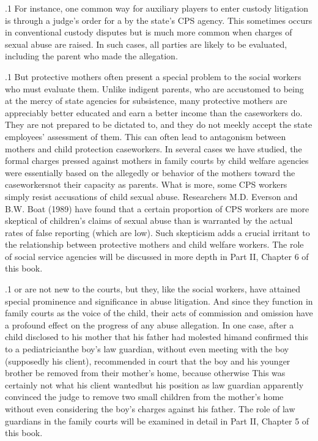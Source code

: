 \documentclass[11pt, twoside]{article}
\begin{document}
{\p.1{%
For instance, one common way for auxiliary players to enter custody
litigation is through a judge’s order for a  by the state’s CPS
agency. This sometimes occurs in conventional custody disputes but is
much more common when charges of sexual abuse are raised. In such
cases, all parties are likely to be evaluated, including the parent who
made the allegation.
}%

\p.1{%
But protective mothers often present a special problem to the social
workers who must evaluate them. Unlike indigent parents, who are accustomed to being at the mercy of state agencies for subsistence, many
protective mothers are appreciably better educated and earn a better income than the caseworkers do. They are not prepared to be dictated
to, and they do not meekly accept the state employees’ assessment of
them. This can often lead to antagonism between mothers and child
protection caseworkers. In several cases we have studied, the formal
charges pressed against mothers in family courts by child welfare agencies were essentially based on the allegedly  or 
behavior of the mothers toward the caseworkers\mdash{}not their capacity
as parents. What is more, some CPS workers simply resist accusations
of child sexual abuse. Researchers M.D. Everson and B.W. Boat (1989) have found
that a certain proportion of CPS workers are more skeptical of children’s
claims of sexual abuse than is warranted by the actual rates of false reporting (which are low). Such skepticism adds a crucial irritant to the
relationship between protective mothers and child welfare workers. The
role of social service agencies will be discussed in more depth in Part II,
Chapter 6 of this book.
}%

\p.1{%
 or  are not new to the courts,
but they, like the social workers, have attained special prominence and
significance in abuse litigation. And since they function in family courts
as the voice of the child, their acts of commission and omission have a
profound effect on the progress of any abuse allegation. In one case, after
a child disclosed to his mother that his father had molested him\mdash{}and
confirmed this to a pediatrician\mdash{}the boy’s law guardian, without even
meeting with the boy (supposedly his client), recommended in court
that the boy and his younger brother be removed from their mother’s
home, because otherwise  This was certainly not what his client wanted\mdash{}but
his position as law guardian apparently convinced the judge to remove
two small children from the mother’s home without even considering
the boy’s charges against his father. The role of  law guardians
in the family courts will be examined in detail in Part II, Chapter 5 of
this book.
}%

}
\end{document}
